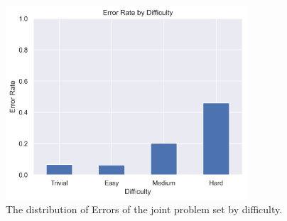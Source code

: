 \begin{figure}[ht]
  \centering
  \includegraphics[width=0.8\textwidth]{figures/Data/dist_joints/Error_Rate_by_Difficulty.png}
  \caption[Error Distribution of the joints by difficulty]{The distribution of Errors of the joint problem set by difficulty.}
  \label{fig:jt_diff_dist}
\end{figure}
